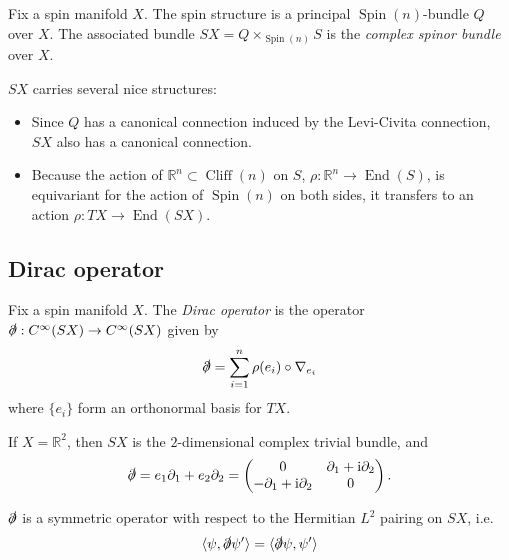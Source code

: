 \documentclass[12pt,letterpaper,reqno]{article}
\numberwithin{equation}{section}
\newcommand{\R}{\ensuremath{\mathbb R}}
\newcommand{\dirac}{\slashed{\partial}}
\newcommand{\I}{{\mathrm i}}
\newcommand{\IP}[1]{\langle#1\rangle}
\newcommand{\ti}[1]{\textit{#1}}
\DeclareMathOperator{\End}{End}
\DeclareMathOperator{\Spin}{Spin}
\DeclareMathOperator{\Cliff}{Cliff}
\begin{document}
\begin{defn} Fix a spin manifold $X$. The spin structure is 
a principal $\Spin(n)$-bundle $Q$ over $X$.
The associated bundle $SX = Q \times_{\Spin(n)} S$ is the \ti{complex spinor bundle} over $X$.
\end{defn}

$SX$ carries several nice structures: 
\begin{itemize}
\item Since $Q$ has a canonical connection induced by the
Levi-Civita connection, $SX$ also has a canonical connection.
\item
Because the action of $\R^n \subset \Cliff(n)$ on $S$,
$\rho: \R^n \to \End(S)$, is
equivariant for the action of $\Spin(n)$ on both sides,
it transfers to an action $\rho: TX \to \End(SX)$.
\end{itemize}


\subsection{Dirac operator}

\begin{defn} Fix a spin manifold $X$.
The \ti{Dirac operator} is the operator
$\dirac: C^\infty(SX) \to C^\infty(SX)$
given by
\begin{equation}
  \dirac = \sum_{i=1}^n \rho(e_i) \circ \nabla_{e_i}
\end{equation}
where $\{e_i\}$ form an orthonormal basis for $TX$.
\end{defn}

\begin{example}[Dirac operator on $\R^2$]
If $X = \R^2$, then $SX$ is the $2$-dimensional complex trivial
bundle, and
\begin{equation}
  \dirac = e_1 \partial_1 + e_2 \partial_2 = \begin{pmatrix} 0 & \partial_1 + \I \partial_2 \\ - \partial_1 + \I \partial_2 & 0 \end{pmatrix}.
\end{equation}
\end{example}

\begin{prop} $\dirac$ is a symmetric operator with respect to the Hermitian $L^2$
pairing on $SX$, i.e.
\begin{equation}
  \IP{\psi, \dirac \psi'} = \IP{\dirac \psi, \psi'}
\end{equation}
\end{prop}
\end{document}
